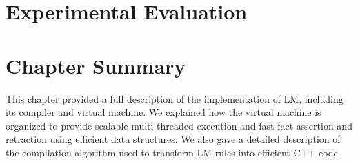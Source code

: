 \section{Experimental Evaluation}


\section{Chapter Summary}

This chapter provided a full description of the implementation of LM, including
its compiler and virtual machine. We explained how the virtual machine is
organized to provide scalable multi threaded execution and fast fact assertion
and retraction using efficient data structures. We also gave a detailed
description of the compilation algorithm used to transform LM rules into
efficient C++ code.
